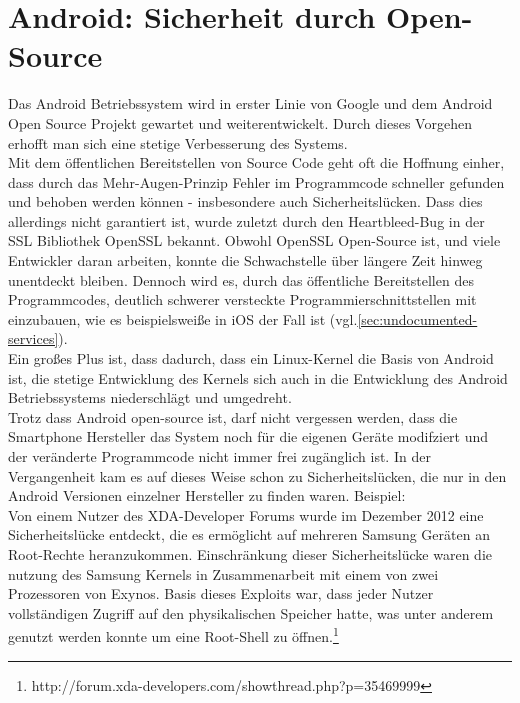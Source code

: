 \section{Android: Sicherheit durch Open-Source}
Das Android Betriebssystem wird in erster Linie von Google und dem Android Open Source Projekt gewartet und weiterentwickelt. Durch dieses Vorgehen erhofft man sich eine stetige Verbesserung des Systems. \\
Mit dem öffentlichen Bereitstellen von Source Code geht oft die Hoffnung einher, dass durch das Mehr-Augen-Prinzip Fehler im Programmcode schneller gefunden und behoben werden können - insbesondere auch Sicherheitslücken.
Dass dies allerdings nicht garantiert ist, wurde zuletzt durch den Heartbleed-Bug in der SSL Bibliothek OpenSSL bekannt. Obwohl OpenSSL Open-Source ist, und viele Entwickler daran arbeiten, konnte die Schwachstelle über längere Zeit hinweg unentdeckt bleiben. Dennoch wird es, durch das öffentliche Bereitstellen des Programmcodes, deutlich schwerer versteckte Programmierschnittstellen mit einzubauen, wie es beispielsweiße in iOS der Fall ist (vgl.\ref{sec:undocumented-services}).\\
Ein großes Plus ist, dass dadurch, dass ein Linux-Kernel die Basis von Android ist, die stetige Entwicklung des Kernels sich auch in die Entwicklung des Android Betriebssystems niederschlägt und umgedreht.\\
Trotz dass Android open-source ist, darf nicht vergessen werden, dass die Smartphone Hersteller das System noch für die eigenen Geräte modifziert und der veränderte Programmcode nicht immer frei zugänglich ist. In der Vergangenheit kam es auf dieses Weise schon zu Sicherheitslücken, die nur in den Android Versionen einzelner Hersteller zu finden waren. Beispiel:\\
Von einem Nutzer des XDA-Developer Forums wurde im Dezember 2012 eine Sicherheitslücke entdeckt, die es ermöglicht auf mehreren Samsung Geräten an Root-Rechte heranzukommen. Einschränkung dieser Sicherheitslücke waren die nutzung des Samsung Kernels in Zusammenarbeit mit einem von zwei Prozessoren von Exynos. Basis dieses Exploits war, dass jeder Nutzer vollständigen Zugriff auf den physikalischen Speicher hatte, was unter anderem genutzt werden konnte um eine Root-Shell zu öffnen.\footnote{http://forum.xda-developers.com/showthread.php?p=35469999} \\
